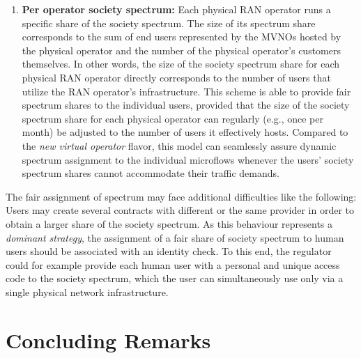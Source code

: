 \documentclass[conference]{IEEEtran}
\begin{document}
\begin{enumerate}
\item \textbf{Per operator society spectrum:} Each physical RAN operator runs a specific share of the society spectrum. The size of its spectrum share corresponds to the sum of end users represented by the  MVNOs hosted by the physical operator and the number of the physical operator's customers themselves. In other words, the size of the society spectrum share for each physical RAN operator directly corresponds to the number of users that utilize the RAN operator's infrastructure. This scheme is able to provide fair spectrum shares to the individual  users, provided that the size of the society spectrum share for each physical operator can regularly (e.g., once per month) be adjusted to the number of users it effectively hosts. Compared to the \textit{new virtual operator} flavor, this model can seamlessly assure dynamic spectrum assignment to the individual microflows whenever the users' society spectrum shares cannot accommodate their traffic demands.





\end{enumerate}



The fair assignment of spectrum may face additional difficulties like the following: Users may create several contracts with different or the same provider in order to obtain a larger share of the society spectrum. As this behaviour represents a \textit{dominant strategy}, the assignment of a fair share of society spectrum to human users should be associated with an identity check. To this end, the regulator could for example provide each human user with a personal and unique access code to the society spectrum, which the user can simultaneously use only via a single physical network infrastructure. 




























\section{Concluding Remarks}
\label{conclusions}
\end{document}
